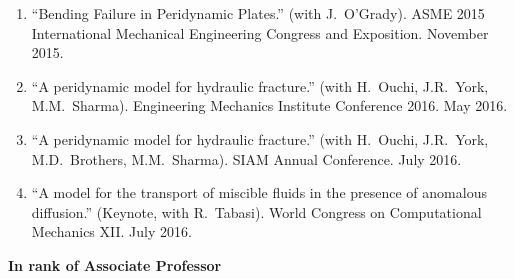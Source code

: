 \begin{enumerate}[resume]
    \item ``Bending Failure in Peridynamic Plates.'' (with J.~O'Grady). ASME 2015 International Mechanical Engineering Congress and Exposition. November 2015.
    \item ``A peridynamic model for hydraulic fracture.'' (with H.\ Ouchi, J.R.\ York, M.M.\ Sharma). Engineering Mechanics Institute Conference 2016. May 2016.
    \item ``A peridynamic model for hydraulic fracture.'' (with H.\ Ouchi, J.R.\ York, M.D.\ Brothers, M.M.\ Sharma). SIAM Annual Conference.  July 2016.
    \item ``A model for the transport of miscible fluids in the presence of anomalous diffusion.'' (Keynote, with R.\ Tabasi). World Congress on Computational Mechanics XII.  July 2016.
\end{enumerate}
    \pagebreak[2]
    \textbf{In rank of Associate Professor}
